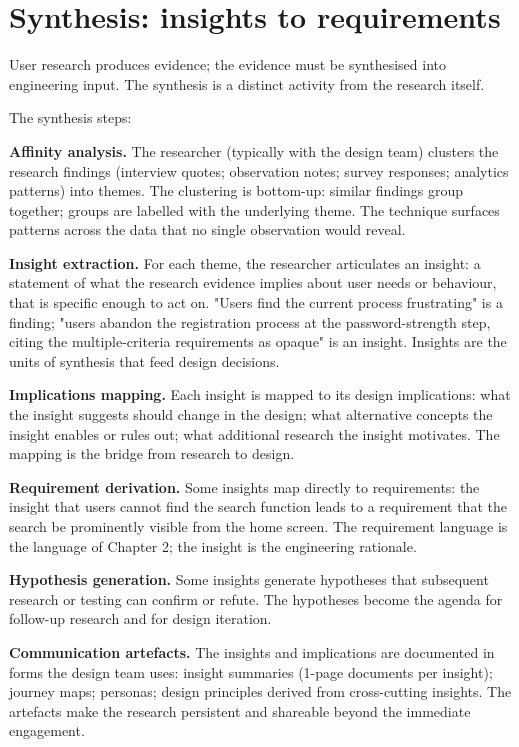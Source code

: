 \section{Synthesis: insights to requirements}

User research produces evidence; the evidence must be synthesised into engineering input. The synthesis is a distinct activity from the research itself.

The synthesis steps:

\textbf{Affinity analysis.} The researcher (typically with the design team) clusters the research findings (interview quotes; observation notes; survey responses; analytics patterns) into themes. The clustering is bottom-up: similar findings group together; groups are labelled with the underlying theme. The technique surfaces patterns across the data that no single observation would reveal.

\textbf{Insight extraction.} For each theme, the researcher articulates an insight: a statement of what the research evidence implies about user needs or behaviour, that is specific enough to act on. "Users find the current process frustrating" is a finding; "users abandon the registration process at the password-strength step, citing the multiple-criteria requirements as opaque" is an insight. Insights are the units of synthesis that feed design decisions.

\textbf{Implications mapping.} Each insight is mapped to its design implications: what the insight suggests should change in the design; what alternative concepts the insight enables or rules out; what additional research the insight motivates. The mapping is the bridge from research to design.

\textbf{Requirement derivation.} Some insights map directly to requirements: the insight that users cannot find the search function leads to a requirement that the search be prominently visible from the home screen. The requirement language is the language of Chapter 2; the insight is the engineering rationale.

\textbf{Hypothesis generation.} Some insights generate hypotheses that subsequent research or testing can confirm or refute. The hypotheses become the agenda for follow-up research and for design iteration.

\textbf{Communication artefacts.} The insights and implications are documented in forms the design team uses: insight summaries (1-page documents per insight); journey maps; personas; design principles derived from cross-cutting insights. The artefacts make the research persistent and shareable beyond the immediate engagement.

